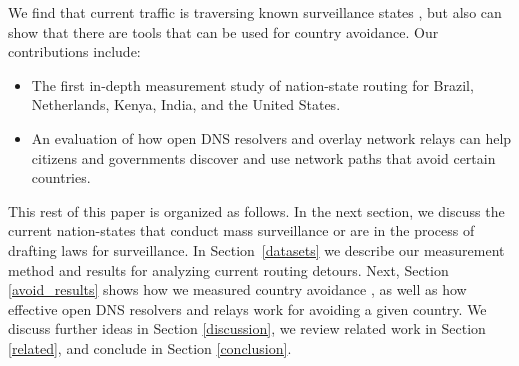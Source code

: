We find that current traffic is traversing known surveillance states , but also
can show that there are tools that can be used for country avoidance. Our contributions 
include: 

\begin{itemize}
\item The first in-depth measurement study of
  nation-state routing for Brazil, Netherlands, Kenya, India, and the
  United States. 
\item An evaluation of how open DNS resolvers and overlay
  network relays can help citizens and governments discover and use
  network paths that avoid certain countries.
\end{itemize}
\noindent

This rest of this paper is organized as follows.  In the next section, we discuss
the current nation-states that conduct mass surveillance or are in the 
process of drafting laws for surveillance.  In
Section~\ref{datasets} we describe our measurement method and results for analyzing current 
routing detours. Next, Section
\ref{avoid_results} shows how we measured country avoidance , as well as how effective open 
DNS resolvers and relays work for avoiding a given country.  We discuss further ideas in Section
\ref{discussion}, we review related work in Section \ref{related}, and
conclude in Section \ref{conclusion}. 
